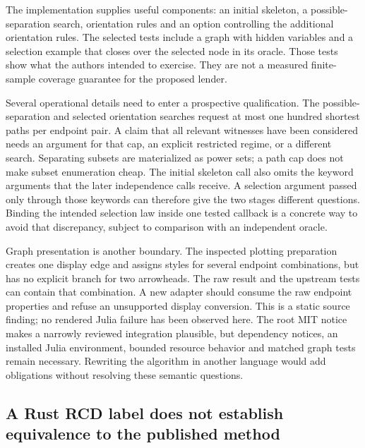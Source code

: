The implementation supplies useful components: an initial skeleton, a
possible-separation search, orientation rules and an option controlling
the additional orientation rules. The selected tests include a graph
with hidden variables and a selection example that closes over the
selected node in its oracle. Those tests show what the authors intended
to exercise. They are not a measured finite-sample coverage guarantee
for the proposed lender. \citep{exec14_olatent_causalinference}

Several operational details need to enter a prospective qualification.
The possible-separation and selected orientation searches request at
most one hundred shortest paths per endpoint pair. A claim that all
relevant witnesses have been considered needs an argument for that cap,
an explicit restricted regime, or a different search. Separating subsets
are materialized as power sets; a path cap does not make subset
enumeration cheap. The initial skeleton call also omits the keyword
arguments that the later independence calls receive. A selection
argument passed only through those keywords can therefore give the two
stages different questions. Binding the intended selection law inside
one tested callback is a concrete way to avoid that discrepancy, subject
to comparison with an independent oracle.
\citep{exec14_olatent_causalinference}

Graph presentation is another boundary. The inspected plotting
preparation creates one display edge and assigns styles for several
endpoint combinations, but has no explicit branch for two arrowheads.
The raw result and the upstream tests can contain that combination. A
new adapter should consume the raw endpoint properties and refuse an
unsupported display conversion. This is a static source finding; no
rendered Julia failure has been observed here. The root MIT notice makes
a narrowly reviewed integration plausible, but dependency notices, an
installed Julia environment, bounded resource behavior and matched graph
tests remain necessary. Rewriting the algorithm in another language
would add obligations without resolving these semantic questions.
\citep{exec14_olatent_causalinference}

\hypertarget{a-rust-rcd-label-does-not-establish-equivalence-to-the-published-method}{%
\subsection{A Rust RCD label does not establish equivalence to the
published
method}\label{a-rust-rcd-label-does-not-establish-equivalence-to-the-published-method}}

